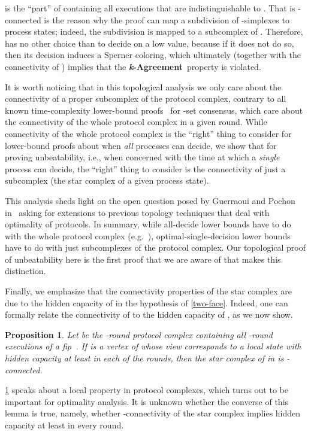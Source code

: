 \documentclass[11pt]{article}
\newtheorem{proposition}{Proposition}
\theoremstyle{definition}
\newcommand{\defemph}[1]{\textbf{\textit{#1}}}
\newcommand{\kAgreement}{{\bf \defemph{k}-Agreement}}
\newcommand{\fip}{{\it fip}}
\begin{document}
is the ``part'' of  containing all executions
that are indistinguishable to .
That  is -connected is the reason why the proof can map a subdivision of
-simplexes
to process states; indeed, the subdivision is mapped to a subcomplex of .
Therefore,  has no other choice than to decide on a low value,
because if it does not do so, then its decision induces a Sperner coloring,
which ultimately (together with the connectivity of )  implies that the \kAgreement\ property is violated.

It is worth noticing that in this topological analysis we only
care about the connectivity of a proper subcomplex of the protocol complex,
contrary to all known time-complexity lower-bound proofs~\cite{GHP,HRT98}
for -set consensus, which care about the
connectivity of the whole protocol complex
in a given round.
While connectivity of the whole protocol complex is the ``right'' thing to consider for lower-bound proofs about when
\emph{all} processes can decide,
we show that for proving unbeatability, i.e., when
concerned with the time at which a \emph{single}
process can decide,
the ``right'' thing to consider is the connectivity of just
a subcomplex
(the star complex of a given process state).

This analysis sheds light on the open question posed by Guerraoui and Pochon in~\cite{GP09}
asking for extensions to previous topology techniques that deal with
optimality of protocols.
In summary, while all-decide lower bounds have to do with
the whole protocol complex (e.g.~\cite{HRT98}),
optimal-single-decision lower bounds have to do
with just subcomplexes of the protocol complex. Our topological proof of unbeatability
here is the first proof that we are aware of that makes this distinction.

Finally, we emphasize
that the connectivity properties of the
star
complex 
are due to
the hidden capacity of  in the hypothesis of \cref{two-face}.
Indeed,
one can formally relate
the connectivity of  to the hidden capacity of ,
as
we now show.

\begin{proposition}
\label{hidden-capacity-connectivity}
Let  be the -round protocol complex
containing all -round executions of
a \fip\ .
If  is a vertex of 
whose view corresponds to a local state with hidden capacity
at least  in each of the  rounds,
then the star complex  of  in  is -connected.
\end{proposition}

\cref{hidden-capacity-connectivity} speaks about a local property in protocol
complexes, which turns out to be important for optimality analysis.
It is unknown whether the converse of this lemma is true, namely,
whether
-connectivity of the star complex implies hidden capacity at least  in every round.
\end{document}
